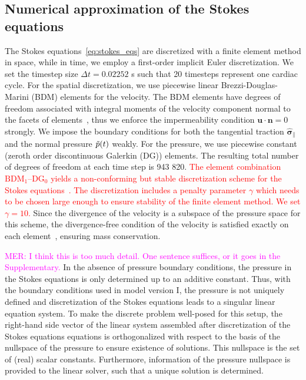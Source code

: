 \documentclass[fleqn]{wlscirep}
\newcommand{\nn}{\mathbf{n}}
\newcommand{\uu}{\mathbf{u}}
\newcommand{\bsig}{\bm{\sigma}}
\newcommand{\bsigpar}{\hat{\bsig}_{\parallel}}
\newcommand{\mer}[1]{\textcolor{magenta}{#1}}
\newcommand{\fixme}[1]{\textcolor{red}{#1}}
\begin{document}
\subsection*{Numerical approximation of the Stokes equations}

The Stokes equations~\eqref{eq:stokes_eqs} are discretized with a finite element method in space, while in time, we employ a first-order implicit Euler discretization. We set the timestep size $\Delta t = 0.02252$ s such that 20 timesteps represent one cardiac cycle. For the spatial discretization, we use piecewise linear Brezzi-Douglas-Marini (BDM) elements for the velocity. The BDM elements have degrees of freedom associated with integral moments of the velocity component normal to the facets of elements~\cite{Brezzi1985TwoProblems}, thus we enforce the impermeability condition $\uu\cdot\nn=0$ strongly. We impose the boundary conditions for both the tangential traction $\bsigpar$ and the normal pressure $\Tilde{p}(t)$ weakly. For the pressure, we use piecewise constant (zeroth order discontinuous Galerkin (DG)) elements. The resulting total number of degrees of freedom at each time step is 943 820. \fixme{The element combination $\mathrm{BDM}_1$--$\mathrm{DG}_{0}$ yields a non-conforming but stable discretization scheme for the Stokes equations~\cite{Stenberg1989SomeEquations}. The discretization includes a penalty parameter $\gamma$ which needs to be chosen large enough to ensure stability of the finite element method. We set $\gamma=10$.} Since the divergence of the velocity is a subspace of the pressure space for this scheme, the divergence-free condition of the velocity is satisfied exactly on each element~\cite{Boffi2008FiniteProblem}, ensuring mass conservation. 

\mer{MER: I think this is too much detail. One sentence suffices, or it goes in the Supplementary.}
In the absence of pressure boundary conditions, the pressure in the Stokes equations is only determined up to an additive constant. Thus, with the boundary conditions used in model version I, the pressure is not uniquely defined and discretization of the Stokes equations leads to a singular linear equation system. To make the discrete problem well-posed for this setup, the right-hand side vector of the linear system assembled after discretization of the Stokes equations equations is orthogonalized with respect to the basis of the nullspace of the pressure to ensure existence of solutions. This nullspace is the set of (real) scalar constants. Furthermore, information of the pressure nullspace is provided to the linear solver, such that a unique solution is determined.
\end{document}
